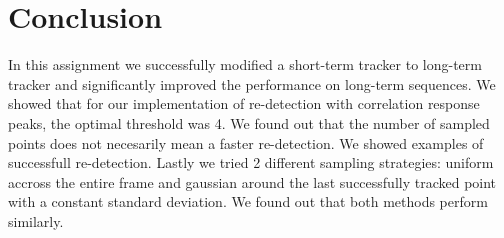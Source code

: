 \documentclass[9pt]{IEEEtran}
\begin{document}
  

\section{Conclusion}
In this assignment we successfully modified a short-term tracker to long-term tracker and significantly
improved the performance on long-term sequences. We showed that for our implementation of 
re-detection with correlation response peaks, the optimal threshold was 4. We found out that the number 
of sampled points does not necesarily mean a faster re-detection. We showed examples 
of successfull re-detection. Lastly we tried 2 different sampling strategies: uniform accross the entire 
frame and gaussian around the last successfully tracked point with a constant standard deviation. 
We found out that both methods perform similarly. 





\end{document}
